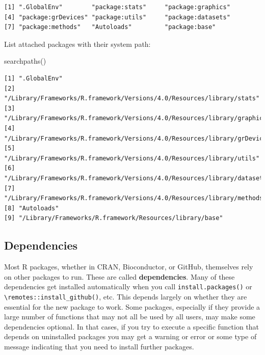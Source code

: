 \documentclass[
]{book}
\newenvironment{Shaded}{\begin{snugshade}}{\end{snugshade}}
\newcommand{\FunctionTok}[1]{\textcolor[rgb]{0.00,0.00,0.00}{#1}}
\newcommand{\NormalTok}[1]{#1}
\begin{document}
\begin{verbatim}
[1] ".GlobalEnv"        "package:stats"     "package:graphics" 
[4] "package:grDevices" "package:utils"     "package:datasets" 
[7] "package:methods"   "Autoloads"         "package:base"     
\end{verbatim}

List attached packages with their system path:

\begin{Shaded}
\begin{Highlighting}[]
\FunctionTok{searchpaths}\NormalTok{()}
\end{Highlighting}
\end{Shaded}

\begin{verbatim}
[1] ".GlobalEnv"                                                              
[2] "/Library/Frameworks/R.framework/Versions/4.0/Resources/library/stats"    
[3] "/Library/Frameworks/R.framework/Versions/4.0/Resources/library/graphics" 
[4] "/Library/Frameworks/R.framework/Versions/4.0/Resources/library/grDevices"
[5] "/Library/Frameworks/R.framework/Versions/4.0/Resources/library/utils"    
[6] "/Library/Frameworks/R.framework/Versions/4.0/Resources/library/datasets" 
[7] "/Library/Frameworks/R.framework/Versions/4.0/Resources/library/methods"  
[8] "Autoloads"                                                               
[9] "/Library/Frameworks/R.framework/Resources/library/base"                  
\end{verbatim}

\hypertarget{dependencies}{%
\subsection{Dependencies}\label{dependencies}}

Most R packages, whether in CRAN, Bioconductor, or GitHub, themselves rely on other packages to run. These are called \textbf{dependencies}. Many of these dependencies get installed automatically when you call \texttt{install.packages()} or \texttt{\textbackslash{}remotes::install\_github()}, etc. This depends largely on whether they are essential for the new package to work. Some packages, especially if they provide a large number of functions that may not all be used by all users, may make some dependencies optional. In that cases, if you try to execute a specific function that depends on uninstalled packages you may get a warning or error or some type of message indicating that you need to install further packages.
\end{document}
